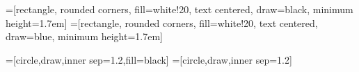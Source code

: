 \DeclareMathOperator*{\argmax}{arg\,max}
\DeclareMathOperator*{\argmin}{arg\,min}
\setlength{\parindent}{0em}
\setlength{\parskip}{1em}
\renewcommand{\baselinestretch}{1}
\newenvironment{thisnote}{\par\color{blue}}{\par}
\makeatletter
\def\FN@baselinestretch{.6}
\makeatother
\renewcommand\qedsymbol{$\blacksquare$}
\newenvironment{solution}
 {\renewcommand\qedsymbol{$\blacksquare$}\begin{proof}[Solution]}
 {\end{proof}}
\newcommand{\dd}{\text{ d}}
\newcommand{\E}[1]{\mathbb{E}\left[#1\right]}
\newcommand{\Ex}[2]{\mathbb{E}_{#1}\left[#2\right]}
\newcommand{\Var}[1]{\text{Var}\left(#1\right)}
\newcommand{\Cov}[1]{\text{Cov}\left(#1\right)}
\newcommand{\pr}[1]{\text{Pr}\left(#1\right)}
\newcommand{\PP}[1]{\mathbb{P}\left[#1\right]}
\newcommand{\pto}{\overset{p}{\to}}
\newcommand{\dto}{\overset{d}{\to}}
\newcommand{\Perp}{\perp\!\!\!\perp}




\newcommand{\foo}{\makebox[0pt]{\textbullet}\hskip-0.5pt\vrule width 1pt\hspace{\labelsep}}

\def\citeapa #1{\citeauthor{#1}, \citeyear{#1}}


\theoremstyle{plain}
\newtheorem{thm}{Theorem}[subsection]
\newtheorem{lem}[thm]{Lemma}
\newtheorem{prop}[thm]{Proposition}
\newtheorem*{cor}{Corollary}

\theoremstyle{definition}
\newtheorem{defn}{Definition}[subsection]
\newtheorem{conj}{Conjecture}[section]
\newtheorem{exmp}{Example}[subsection]

\theoremstyle{remark}
\newtheorem*{rem}{Remark}
\newtheorem*{note}{Note}


=[rectangle, rounded corners, fill=white!20, text centered, draw=black,  minimum height=1.7em]
=[rectangle, rounded corners, fill=white!20, text centered, draw=blue,  minimum height=1.7em]

=[circle,draw,inner sep=1.2,fill=black]
=[circle,draw,inner sep=1.2]

